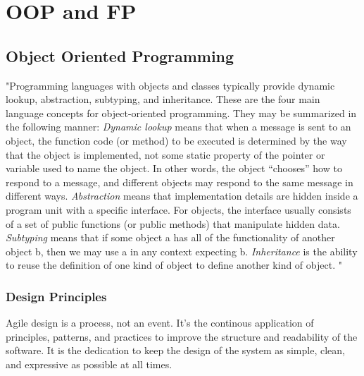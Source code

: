 \chapter{OOP and FP}
\section{Object Oriented Programming}
"Programming languages with objects and classes typically provide dynamic lookup, abstraction, subtyping, and inheritance. These are the four main language concepts for object-oriented programming. They may be summarized in the following manner:
\textit{Dynamic lookup} means that when a message is sent to an object, the function code (or method) to be executed is determined by the way that the object is implemented, not some static property of the pointer or variable used to name the object. In other words, the object “chooses” how to respond to a message, and different objects may respond to the same message in different ways.
\textit{Abstraction} means that implementation details are hidden inside a program unit with a specific interface. For objects, the interface usually consists of a set of public functions (or public methods) that manipulate hidden data.
\textit{Subtyping} means that if some object a has all of the functionality of another object b, then we may use a in any context expecting b.
\textit{Inheritance} is the ability to reuse the definition of one kind of object to define another kind of object.
"\cite{concepts}

\subsection{Design Principles}

Agile design is a process, not an event.
It's the continous application of principles, patterns, and practices to improve the structure and readability of the software. 
It is the dedication to keep the design of the system as simple, clean, and expressive as possible at all times.\cite{MartinASD}


